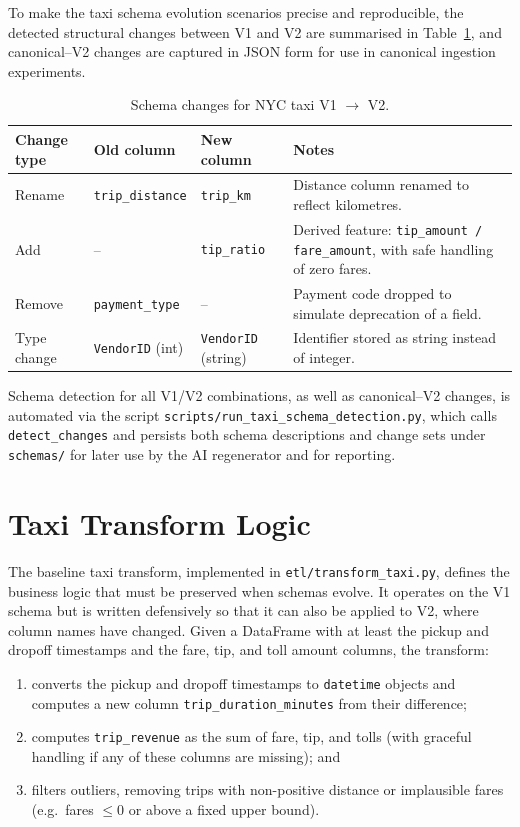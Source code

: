 To make the taxi schema evolution scenarios precise and reproducible, the
detected structural changes between V1 and V2 are summarised in
Table~\ref{tbl:taxi-v1-v2-changes}, and canonical--V2 changes are captured in
JSON form for use in canonical ingestion experiments.

\begin{table}[h]
  \centering
  \caption{Schema changes for NYC taxi V1 $\rightarrow$ V2.}
  \label{tbl:taxi-v1-v2-changes}
  \begin{tabular}{lllp{6cm}}
    \hline
    Change type & Old column & New column & Notes \\
    \hline\hline
    Rename      & \texttt{trip\_distance} & \texttt{trip\_km} & Distance column renamed to reflect kilometres. \\
    Add         & --                      & \texttt{tip\_ratio} & Derived feature: \texttt{tip\_amount / fare\_amount}, with safe handling of zero fares. \\
    Remove      & \texttt{payment\_type}  & --                & Payment code dropped to simulate deprecation of a field. \\
    Type change & \texttt{VendorID} (int) & \texttt{VendorID} (string) & Identifier stored as string instead of integer. \\
    \hline
  \end{tabular}
\end{table}

Schema detection for all V1/V2 combinations, as well as canonical--V2 changes,
is automated via the script
\texttt{scripts/run\_taxi\_schema\_detection.py}, which calls
\texttt{detect\_changes} and persists both schema descriptions and change sets
under \texttt{schemas/} for later use by the AI regenerator and for reporting.


\section{Taxi Transform Logic}
\label{sec:method-taxi-transform}

The baseline taxi transform, implemented in \texttt{etl/transform\_taxi.py},
defines the business logic that must be preserved when schemas evolve. It
operates on the V1 schema but is written defensively so that it can also be
applied to V2, where column names have changed. Given a DataFrame with at least
the pickup and dropoff timestamps and the fare, tip, and toll amount columns,
the transform:
%
\begin{enumerate}
  \item converts the pickup and dropoff timestamps to \texttt{datetime}
  objects and computes a new column \texttt{trip\_duration\_minutes} from
  their difference;
  \item computes \texttt{trip\_revenue} as the sum of fare, tip, and tolls
  (with graceful handling if any of these columns are missing); and
  \item filters outliers, removing trips with non-positive distance or
  implausible fares (e.g.\ fares $\leq 0$ or above a fixed upper bound).
\end{enumerate}

